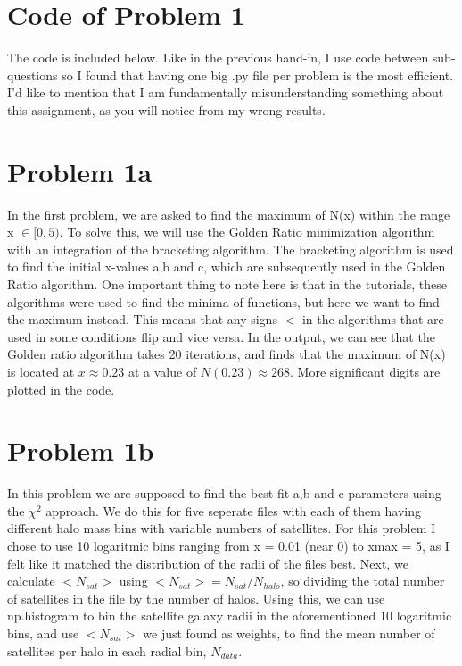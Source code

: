 \section*{Code of Problem 1}

The code is included below. Like in the previous hand-in, I use code between sub-questions so I found that having one big .py file per problem is the most efficient. I'd like to mention that I am fundamentally misunderstanding something about this assignment, as you will notice from my wrong results. 



\section*{Problem 1a}

In the first problem, we are asked to find the maximum of N(x) within the range x $\in [0,5)$. To solve this, we will use the Golden Ratio minimization algorithm with an integration of the bracketing algorithm. The bracketing algorithm is used to find the initial x-values a,b and c, which are subsequently used in the Golden Ratio algorithm. One important thing to note here is that in the tutorials, these algorithms were used to find the minima of functions, but here we want to find the maximum instead. This means that any signs $<$ in the algorithms that are used in some conditions flip and vice versa. In the output, we can see that the Golden ratio algorithm takes 20 iterations, and finds that the maximum of N(x) is located at $x \approx 0.23$ at a value of $N(0.23) \approx 268$. More significant digits are plotted in the code. 



\section*{Problem 1b}

In this problem we are supposed to find the best-fit a,b and c parameters using the $\chi^2$ approach. We do this for five seperate files with each of them having different halo mass bins with variable numbers of satellites. For this problem I chose to use 10 logaritmic bins ranging from x = 0.01 (near 0) to xmax = 5, as I felt like it matched the distribution of the radii of the files best. Next, we calculate $<N_{sat}>$ using $<N_{sat}> = N_{sat} / N_{halo}$, so dividing the total number of satellites in the file by the number of halos. Using this, we can use np.histogram to bin the satellite galaxy radii in the aforementioned 10 logaritmic bins, and use $<N_{sat}>$ we just found as weights, to find the mean number of satellites per halo in each radial bin, $N_{data}$.\\

